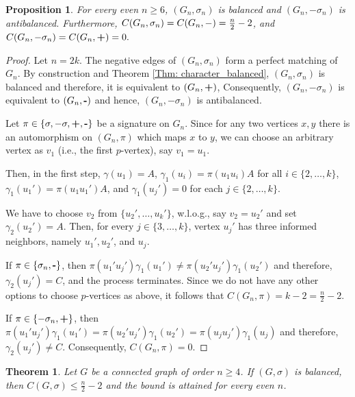\documentclass[a4paper,11pt]{article}
\newtheorem{theo}[defi]{Theorem}
\newtheorem{prop}[defi]{Proposition}
\theoremstyle{remark}
\begin{document}
\begin{prop}\label{prop_G_n}
For every even $n \geq 6$, $(G_n, \sigma_n)$ is balanced and 
$(G_n, -\sigma_n)$ is antibalanced. Furthermore,
$C(G_n,\sigma_n) = C(G_n,\texttt{\bf $-$}) = \frac{n}{2}-2$, and
$C(G_n,-\sigma_n) = C(G_n,\texttt{\bf +}) = 0.$
\end{prop}

\begin{proof} Let $n = 2k$. 
The negative edges of $(G_n,\sigma_n)$ form a perfect matching of
$G_n$. By construction and Theorem \ref{Thm: character_balanced}, $(G_n,\sigma_n)$ is balanced and therefore, it
is equivalent to $(G_n,\texttt{\bf +})$, Consequently, $(G_n,-\sigma_n)$
is equivalent to $(G_n,\texttt{\bf -})$ and hence, $(G_n,-\sigma_n)$ is antibalanced. 

Let $\pi \in \{\sigma, -\sigma, \texttt{\bf +},\texttt{\bf -}\}$
be a signature on $G_n$. 
Since for any two vertices $x,y$ there is an automorphism on $(G_n,\pi)$ 
which maps $x$ to $y$, we can choose an arbitrary vertex as $v_1$ (i.e., the first $p$-vertex), say $v_1 = u_1$. 

Then, in the first step, $\gamma(u_1)=A$, 
$\gamma_1(u_i) = \pi(u_1u_i) A$ for all $i \in \{2, \dots, k\}$, 
$\gamma_1(u_1') = \pi(u_1u_1')A$, and $\gamma_1(u_j')=0$ for each $j \in \{2, \dots, k\}$.

We have to choose $v_2$ from $\{u_2', \dots, u_k'\}$, w.l.o.g., say $v_2 = u_2'$ and set $\gamma_2(u_2') = A$.
Then, for every $j \in \{3, \dots, k\}$, vertex $u_j'$ has three informed 
neighbors, namely $u_1',u_2'$, and $u_j$.

If $\pi \in \{\sigma_n, \texttt{\bf -}\}$, then 
$\pi(u_1'u_j')\gamma_1(u_1') \not = \pi(u_2'u_j')\gamma_1(u_2')$
and therefore, $\gamma_2(u_j') = C$, and the process terminates.
Since we do not have any other options to choose $p$-vertices as above, it follows that $C(G_n,\pi) = k-2 = \frac{n}{2}-2$.

If $\pi\in \{-\sigma_n, \texttt{\bf +}\}$, then 
$\pi(u_1'u_j')\gamma_1(u_1') = \pi(u_2'u_j')\gamma_1(u_2')
= \pi(u_ju_j')\gamma_1(u_j)$  
and therefore, $\gamma_2(u_j') \neq C$. Consequently, $C(G_n,\pi) = 0$.  
\end{proof}


\begin{theo} \label{Theo: bound balanced graphs}
 Let $G$ be a connected graph of order $n \geq 4$. If $(G,\sigma)$ is balanced, 
 then $C(G,\sigma) \leq \frac{n}{2}-2$ and the bound is attained for every even $n$.    
\end{theo}
\end{document}
